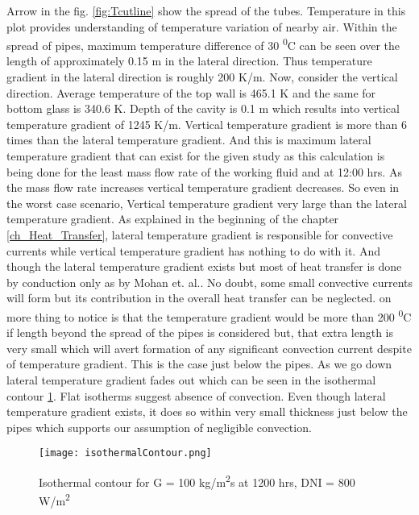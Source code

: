 Arrow in the fig. \ref{fig:Tcutline} show the spread of the tubes. Temperature in this plot provides understanding of temperature variation of nearby air. Within the spread of pipes, maximum temperature difference of 30 \textsuperscript{0}C can be seen over the length of approximately 0.15 m in the lateral direction. Thus temperature gradient in the lateral direction is roughly 200 K/m. Now, consider the vertical direction. Average temperature of the top wall is 465.1 K and the same for bottom glass is 340.6 K. Depth of the cavity is 0.1 m which results into vertical temperature gradient of 1245 K/m. Vertical temperature gradient is more than 6 times than the lateral temperature gradient. And this is maximum lateral temperature gradient that can exist for the given study as this calculation is being done for the least mass flow rate of the working fluid and at 12:00 hrs. As the mass flow rate increases vertical temperature gradient decreases. So even in the worst case scenario, Vertical temperature gradient very large than the lateral temperature gradient. As explained in the beginning of the chapter \ref{ch_Heat_Transfer}, lateral temperature gradient is responsible for convective currents while vertical temperature gradient has nothing to do with it. And though the lateral temperature gradient exists but most of heat transfer is done by conduction only as by Mohan et. al.\citep{MOHAN201837}. No doubt, some small convective currents will form but its contribution in the overall heat transfer can be  neglected. on more thing to notice is that the temperature gradient would be more than 200 \textsuperscript{0}C if length beyond the spread of the pipes is considered but, that extra length is very small which will avert formation of any significant convection current despite of temperature gradient. This is the case just below the pipes. As we go down lateral temperature gradient fades out which can be seen in the isothermal contour \ref{fig:isothermG1001200hrs}. Flat isotherms suggest absence of convection. Even though lateral temperature gradient exists, it does so within very small thickness just below the pipes which supports our assumption of negligible convection.

\begin{figure}[H]
\begin{center}
\texttt{[image: isothermalContour.png]}
\caption{Isothermal contour for G = 100 kg/m\textsuperscript{2}s at 1200 hrs, DNI = 800 W/m\textsuperscript{2}}
\label{fig:isothermG1001200hrs}
\end{center}
\end{figure} 



